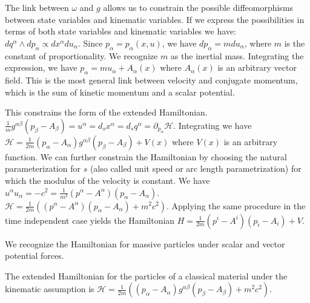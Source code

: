 \documentclass[smallextended]{svjour3}
\numberwithin{equation}{section}
\begin{document}
The link between $\omega$ and $g$ allows us to constrain the possible diffeomorphisms between state variables and kinematic variables. If we express the possibilities in terms of both state variables and kinematic variables we have: $dq^\alpha \wedge dp_\alpha \propto dx^\alpha du_\alpha$. Since  $p_\alpha=p_\alpha(x, u)$, we have $dp_\alpha = m du_\alpha$, where $m$ is the constant of proportionality. We recognize $m$ as the inertial mass. Integrating the expression, we have $p_\alpha = m u_\alpha + A_\alpha(x)$ where $A_\alpha(x)$ is an arbitrary vector field. This is the most general link between velocity and conjugate momentum, which is the sum of kinetic momentum and a scalar potential.

This constrains the form of the extended Hamiltonian. $\frac{1}{m}g^{\alpha\beta}(p_\beta-A_\beta) = u^\alpha = d_s x^\alpha = d_s q^\alpha = \partial_{p_\alpha} \mathcal{H}$. Integrating we have $\mathcal{H}=\frac{1}{2m}(p_\alpha-A_\alpha)g^{\alpha\beta}(p_\beta-A_\beta)+V(x)$ where $V(x)$ is an arbitrary function. We can further constrain the Hamiltonian by choosing the natural parameterization for $s$ (also called unit speed or arc length parametrization) for which the modulus of the velocity is constant. We have $u^\alpha u_\alpha = - c^2 = \frac{1}{m^2}(p^\alpha-A^\alpha)(p_\alpha-A_\alpha)$. $\mathcal{H}=\frac{1}{2m}((p^\alpha-A^\alpha)(p_\alpha-A_\alpha) + m^2 c^2)$. Applying the same procedure in the time independent case yields the Hamiltonian $H=\frac{1}{2m}(p^i-A^i)(p_i-A_i)+V$.

We recognize the Hamiltonian for massive particles under scalar and vector potential forces.

\begin{prop}\label{prop:kinetic_hamiltonian}
The extended Hamiltonian for the particles of a classical material under the kinematic assumption is $\mathcal{H}=\frac{1}{2m}((p_\alpha-A_\alpha)g^{\alpha\beta}(p_\beta-A_\beta) + m^2 c^2)$.
\end{prop}
\end{document}
